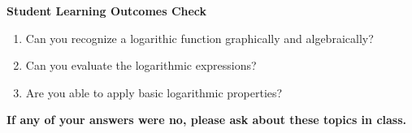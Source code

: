 \documentclass[11pt]{article}
\begin{document}
\noindent \textbf{Student Learning Outcomes Check}

\begin{enumerate}
\item Can you recognize a logarithic function graphically and algebraically?
\item Can you evaluate the logarithmic expressions?
\item Are you able to apply basic logarithmic properties?

\end{enumerate}

\noindent \textbf{If any of your answers were no, please ask about these topics in class.}
\end{document}

